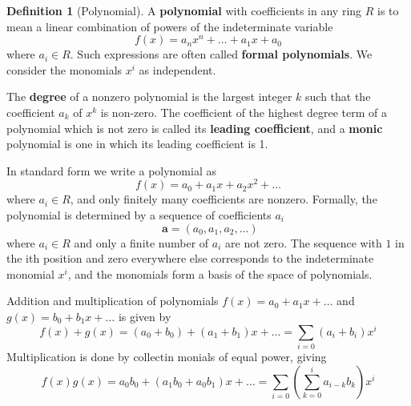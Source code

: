 \documentclass[12pt]{article}
\theoremstyle{definition}
\newtheorem{defn}[thm]{Definition}
\theoremstyle{remark}
\numberwithin{equation}{section}
\newcommand\B[1]{\textbf{ #1}}
\begin{document}
\vspace{15pt}

\begin{defn}[Polynomial]
        A \B{polynomial} with coefficients in any ring $R$ is to mean a linear combination of powers of the indeterminate variable \begin{equation}
                f(x) = a_nx^n + \hdots + a_1x + a_0
        \end{equation}
        where $a_i \in R$. Such expressions are often called \B{formal polynomials}. We consider the monomials $x^i$ as independent. 


        The \B{degree} of a nonzero polynomial is the largest integer $k$ such that the coefficient $a_k$ of $x^k$ is non-zero. The coefficient of the highest degree term of a polynomial which is not zero is called its \B{leading coefficient}, and a \B{monic} polynomial is one in which its leading coefficient is 1.


        In standard form we write a polynomial as \begin{equation}
                f(x) = a_0 + a_1x + a_2x^2 + \hdots 
        \end{equation}
        where $a_i \in R$, and only finitely many coefficients are nonzero. Formally, the polynomial is determined by a sequence of coefficients $a_i$ \begin{equation}
                \B{a} = (a_0,a_1,a_2,...)
        \end{equation}
        where $a_i \in R$ and only a finite number of $a_i$ are not zero. The sequence with $1$ in the ith position and zero everywhere else corresponds to the indeterminate monomial $x^i$, and the monomials form a basis of the space of polynomials.


        Addition and multiplication of polynomials $f(x) = a_0+a_1x+\hdots$ and $g(x) = b_0 + b_1x + \hdots$ is given by \begin{equation}
                f(x) + g(x) = (a_0+b_0) + (a_1+b_1)x + \hdots = \sum\limits_{i=0}(a_i+b_i)x^i
        \end{equation}
        Multiplication is done by collectin monials of equal power, giving \begin{equation}
                f(x)g(x) = a_0b_0 + (a_1b_0 + a_0b_1)x + \hdots = \sum\limits_{i=0}\left(\sum\limits_{k=0}^ia_{i-k}b_k\right)x^i
        \end{equation}
\end{defn}

\vspace{15pt}
\end{document}
